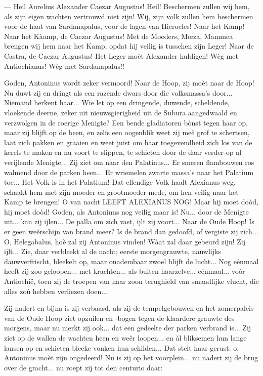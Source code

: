 \documentclass[a4paper, 12pt, oneside, dutch]{article}
\begin{document}
--- Heil Aurelius Alexander Caezar Augustus! Heil! Beschermen zullen wij hem, als zijn eigen wachten vertrouwd niet zijn! Wij, zijn volk zullen hem beschermen voor de haat van Sardanapalus, voor de lagen van Hierocles! Naar het Kamp! Naar het Kàamp, de Caezar Augustus! Met de Moeders, Mœza, Mammea brengen wij hem naar het Kamp, opdat hij veilig is tusschen zijn Leger! Naar de Castra, de Caezar Augustus! Het Leger moèt Alexander huldigen! Wèg met Antiochianus! Wèg met Sardanapalus!!

Goden, Antoninus wordt zeker vermoord! Naar de Hoop, zij moèt naar de Hoop! Nu duwt zij en dringt als een razende dwars door die volksmassa's door... Niemand herkent haar... Wie let op een dringende, duwende, scheldende, vloekende deerne, zeker uit nieuwsgierigheid uit de Subura aangedwaald en verzwolgen in de roerige Menigte? Een bende gladiatoren bònst tegen haar op, maar zij blijft op de been, en zelfs een oogenblik weet zij meê grof te schertsen, laat zich pakken en graaien en weet juist om haar toegevendheid zich los van de kerels te maken en nu voort te slippen, te schieten door de daar verder-op al verijlende Menigte... Zij ziet om naar den Palatinus... Er smeren flambouwen ros walmend door de parken heen... Er wriemelen zwarte massa's naar het Palatium toe... Het Volk is in het Palatium! Dat ellendige Volk haalt Alexianus weg, schaakt hem met zijn moeder en grootmoeder mede, om hen veilig naar het Kamp te brengen! O van nacht LEEFT ALEXIANUS NOG! Maar hij moet doòd, hij moet doòd! Goden, als Antoninus nog veilig maar is! Nu... door de Menigte uit... kan zij ijlen... De palla om zich vast, ijlt zij voort... Naar de Oude Hoop! Is er geen weêrschijn van brand meer? Is de brand dan gedoofd, of vergiste zij zich... O, Helegabalus, hoè zal zij Antoninus vinden! Wàat zal daar gebeurd zijn! Zij ijlt... Zie, daar verbleekt al de nacht; eerste morgengrauwte, nauwlijks dauwverfrischt, bleekelt op, maar onadembaar zwoel blijft de lucht... Nog eénmaal heeft zij zoo geloopen... met krachten... als buiten haarzelve... eénmaal... voór Antiochië, toen zij de troepen van haar zoon terughield van smaadlijke vlucht, die alles zoû hebben verliezen doen...

Zij nadert en bijna is zij verbaasd, als zij de tempelgebouwen en het zomerpaleis van de Oude Hoop ziet opzuilen en -bogen tegen de klaardere grauwte des morgens, maar nu merkt zij ook... dat een gedeelte der parken verbrand is... Zij ziet op de wallen de wachten heen en weêr loopen... en àl bliksemen hun lange lansen op en schieten bleeke vonken hun schilden... Dat stelt haar gerust: o, Antoninus moèt zijn ongedeerd! Nu is zij op het voorplein... nu nadert zij de brug over de gracht... nu roept zij tot den centurio daar:
\end{document}
